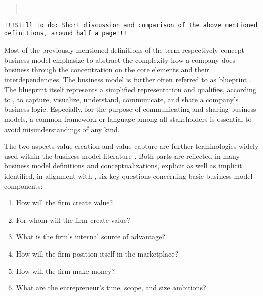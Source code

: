 \begin{quotation}\vspace*{-5pt}{\slshape 
A business model describes the rationale of how an organization creates, delivers and captures value.}
\vspace*{-7pt}
\begin{flushright}
	--- \citealp[p. 14]{Osterwalder2010}
\end{flushright}
\end{quotation}

\texttt{!!!Still to do: Short discussion and comparison of the above mentioned definitions, around half a page!!!}

Most of the previously mentioned definitions of the term respectively concept business model emphasize to abstract the complexity how a company does business through the concentration on the core elements and their interdependencies. The business model is further often referred to as blueprint . The blueprint itself represents a simplified representation and qualifies, according to \citet[pp. 11-14]{Osterwalder2005}, to capture, visualize, understand, communicate, and share a company's business logic. Especially, for the purpose of communicating and sharing business models, a common framework or language among all stakeholders is essential to avoid misunderstandings of any kind.

The two aspects value creation and value capture are further terminologies widely used within the business model literature . Both parts are reflected in many business model definitions and conceptualizations, explicit as well as implicit. \citet[pp. 729-732]{Morris2005} identified, in alignment with \citet[pp. 49-61]{Drucker1954}, six key questions concerning basic business model components:

\begin{enumerate}[parsep=0pt, topsep=0pt, itemsep=0pt]
	\item How will the firm create value?
	\item For whom will the firm create value?
	\item What is the firm's internal source of advantage?
	\item How will the firm position itself in the marketplace?
	\item How will the firm make money?
	\item What are the entrepreneur's time, scope, and size ambitions?
\end{enumerate}

